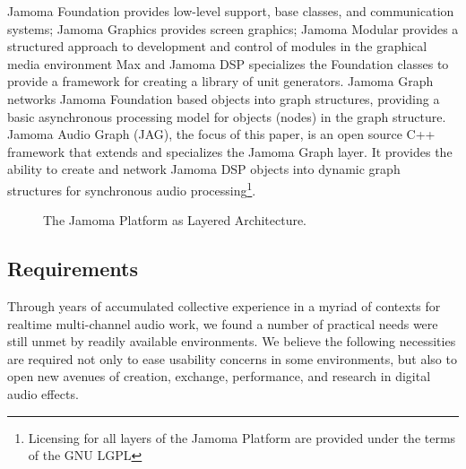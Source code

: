 \documentclass[twoside,a4paper]{article}
\begin{document}
Jamoma Foundation provides low-level support, base classes, and communication systems; Jamoma Graphics provides screen graphics; Jamoma Modular provides a structured approach to development and control of modules in the graphical media environment Max \cite{Place:2006} and Jamoma DSP specializes the Foundation classes to provide a framework for creating a library of unit generators. 
Jamoma Graph networks Jamoma Foundation based objects into graph structures, providing a basic asynchronous processing model for objects (nodes) in the graph structure. 
Jamoma Audio Graph (JAG), the focus of this paper, is an open source C++ framework that extends and specializes the Jamoma Graph layer.  It provides the ability to create and network Jamoma DSP objects into dynamic graph structures for synchronous audio processing\footnote{Licensing for all layers of the Jamoma Platform are provided under the terms of the GNU LGPL}.  


\begin{figure}[htbp]
\centerline{}
\caption{The Jamoma Platform as Layered Architecture.}
\label{fig:layers}
\end{figure}


\subsection{Requirements}

Through years of accumulated collective experience in a myriad of contexts for realtime multi-channel audio work, we found a number of practical needs were still unmet by readily available environments.  We believe the following necessities are required not only to ease usability concerns in some environments, but also to open new avenues of creation, exchange, performance, and research in digital audio effects.
\end{document}
